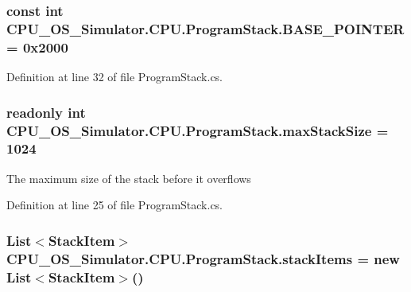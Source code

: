 \subsubsection[{B\+A\+S\+E\+\_\+\+P\+O\+I\+N\+T\+E\+R}]{\setlength{\rightskip}{0pt plus 5cm}const int C\+P\+U\+\_\+\+O\+S\+\_\+\+Simulator.\+C\+P\+U.\+Program\+Stack.\+B\+A\+S\+E\+\_\+\+P\+O\+I\+N\+T\+E\+R = 0x2000}\label{class_c_p_u___o_s___simulator_1_1_c_p_u_1_1_program_stack_a8fd75061f8ea538917fcc3b5718bc0d8}


Definition at line 32 of file Program\+Stack.\+cs.

\hypertarget{class_c_p_u___o_s___simulator_1_1_c_p_u_1_1_program_stack_a2e475bb3c8ce48b8b0a86e31b2cb972e}{}
\subsubsection[{max\+Stack\+Size}]{\setlength{\rightskip}{0pt plus 5cm}readonly int C\+P\+U\+\_\+\+O\+S\+\_\+\+Simulator.\+C\+P\+U.\+Program\+Stack.\+max\+Stack\+Size = 1024\hspace{0.3cm}{\ttfamily [private]}}\label{class_c_p_u___o_s___simulator_1_1_c_p_u_1_1_program_stack_a2e475bb3c8ce48b8b0a86e31b2cb972e}


The maximum size of the stack before it overflows 



Definition at line 25 of file Program\+Stack.\+cs.

\hypertarget{class_c_p_u___o_s___simulator_1_1_c_p_u_1_1_program_stack_ada087487ee69e4e38e2f2591bdc28f37}{}
\subsubsection[{stack\+Items}]{\setlength{\rightskip}{0pt plus 5cm}List$<${\bf Stack\+Item}$>$ C\+P\+U\+\_\+\+O\+S\+\_\+\+Simulator.\+C\+P\+U.\+Program\+Stack.\+stack\+Items = new List$<${\bf Stack\+Item}$>$()\hspace{0.3cm}{\ttfamily [private]}}\label{class_c_p_u___o_s___simulator_1_1_c_p_u_1_1_program_stack_ada087487ee69e4e38e2f2591bdc28f37}


